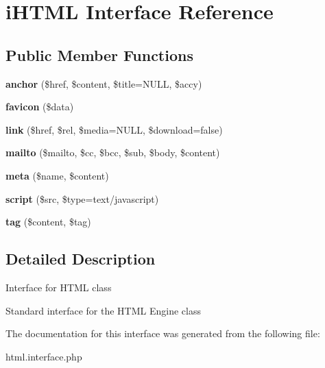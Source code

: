 \hypertarget{interface_w_a_f_f_l_e_1_1_framework_1_1_interfaces_1_1i_h_t_m_l}{}\section{i\+H\+T\+ML Interface Reference}
\label{interface_w_a_f_f_l_e_1_1_framework_1_1_interfaces_1_1i_h_t_m_l}
\subsection*{Public Member Functions}
\begin{DoxyCompactItemize}
\item 
\mbox{\label{interface_w_a_f_f_l_e_1_1_framework_1_1_interfaces_1_1i_h_t_m_l_aef42f93e488e349161740f935a45b12e}} 
{\bfseries anchor} (\$href, \$content, \$title=N\+U\+LL, \$accy)
\item 
\mbox{\label{interface_w_a_f_f_l_e_1_1_framework_1_1_interfaces_1_1i_h_t_m_l_a9765bd1f47414643afb176d0f249d428}} 
{\bfseries favicon} (\$data)
\item 
\mbox{\label{interface_w_a_f_f_l_e_1_1_framework_1_1_interfaces_1_1i_h_t_m_l_a7596de1be94a6dc237fa4d435193da8b}} 
{\bfseries link} (\$href, \$rel, \$media=N\+U\+LL, \$download=false)
\item 
\mbox{\label{interface_w_a_f_f_l_e_1_1_framework_1_1_interfaces_1_1i_h_t_m_l_a77b7fda51b7845d6a6c738efc5d248ff}} 
{\bfseries mailto} (\$mailto, \$cc, \$bcc, \$sub, \$body, \$content)
\item 
\mbox{\label{interface_w_a_f_f_l_e_1_1_framework_1_1_interfaces_1_1i_h_t_m_l_af2959b14380c3635ed932a5d1b877bd8}} 
{\bfseries meta} (\$name, \$content)
\item 
\mbox{\label{interface_w_a_f_f_l_e_1_1_framework_1_1_interfaces_1_1i_h_t_m_l_aa59c53e797a510a8bdf06677ab9795b8}} 
{\bfseries script} (\$src, \$type=\textquotesingle{}text/javascript\textquotesingle{})
\item 
\mbox{\label{interface_w_a_f_f_l_e_1_1_framework_1_1_interfaces_1_1i_h_t_m_l_a61aeb234b0eb5d6895f91ba5b533bfce}} 
{\bfseries tag} (\$content, \$tag)
\end{DoxyCompactItemize}


\subsection{Detailed Description}
Interface for H\+T\+ML class

Standard interface for the H\+T\+ML Engine class 

The documentation for this interface was generated from the following file\+:\begin{DoxyCompactItemize}
\item 
html.\+interface.\+php\end{DoxyCompactItemize}
